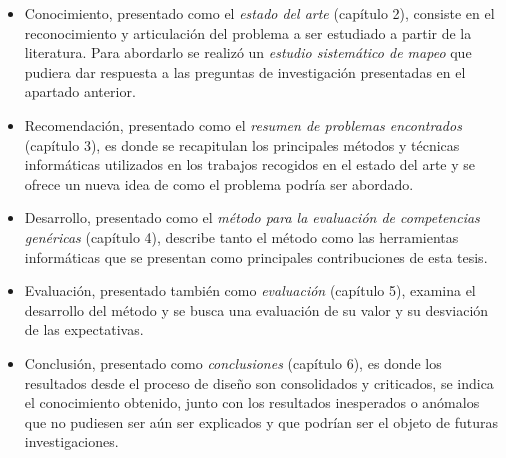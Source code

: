 \begin{itemize}
\item Conocimiento, presentado como el \emph{estado del arte} (capítulo 2), consiste en el reconocimiento y articulación del problema a ser estudiado a partir de la literatura. Para abordarlo se realizó un \emph{estudio sistemático de mapeo} que pudiera dar respuesta a las preguntas de investigación presentadas en el apartado anterior.
\item Recomendación, presentado como el \emph{resumen de problemas encontrados} (capítulo 3), es donde se recapitulan los principales métodos y técnicas informáticas utilizados en los trabajos recogidos en el estado del arte y se ofrece un nueva idea de como el problema podría ser abordado. 
\item Desarrollo, presentado como el \emph{método para la evaluación de competencias genéricas} (capítulo 4), describe tanto el método como las herramientas informáticas que se presentan como principales contribuciones de esta tesis.
\item Evaluación, presentado también como \emph{evaluación} (capítulo 5), examina el desarrollo del método y se busca una evaluación de su valor y su desviación de las expectativas.
\item Conclusión, presentado como \emph{conclusiones} (capítulo 6), es donde los resultados desde el proceso de diseño son consolidados y criticados, se indica el conocimiento obtenido, junto con los resultados inesperados o anómalos que no pudiesen ser aún ser explicados y que podrían ser el objeto de futuras investigaciones.
\end{itemize}




